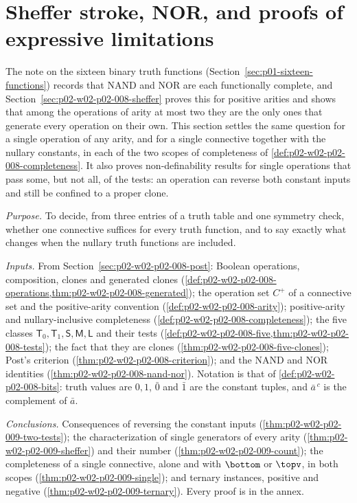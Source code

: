 \section{Sheffer stroke, NOR, and proofs of expressive limitations}
\label{sec:p02-w02-p02-009-sheffer}

The note on the sixteen binary truth functions
(Section~\ref{sec:p01-sixteen-functions}) records that NAND and NOR are each
functionally complete, and Section~\ref{sec:p02-w02-p02-008-sheffer} proves
this for positive arities and shows that among the operations of arity at
most two they are the only ones that generate every operation on their own.
This section settles the same question for a single operation of any arity,
and for a single connective together with the nullary constants, in each of
the two scopes of completeness of \cref{def:p02-w02-p02-008-completeness}.
It also proves non-definability results for single operations that pass
some, but not all, of the tests: an operation can reverse both constant
inputs and still be confined to a proper clone.

\emph{Purpose.}  To decide, from three entries of a truth table and one
symmetry check, whether one connective suffices for every truth function,
and to say exactly what changes when the nullary truth functions are
included.

\emph{Inputs.}  From Section~\ref{sec:p02-w02-p02-008-post}: Boolean
operations, composition, clones and generated clones
(\cref{def:p02-w02-p02-008-operations,thm:p02-w02-p02-008-generated}); the
operation set \(C^+\) of a connective set and the positive-arity convention
(\cref{def:p02-w02-p02-008-arity}); positive-arity and nullary-inclusive
completeness (\cref{def:p02-w02-p02-008-completeness}); the five classes
\(\mathsf T_0,\mathsf T_1,\mathsf S,\mathsf M,\mathsf L\) and their tests
(\cref{def:p02-w02-p02-008-five,thm:p02-w02-p02-008-tests}); the fact that
they are clones (\cref{thm:p02-w02-p02-008-five-clones}); Post's criterion
(\cref{thm:p02-w02-p02-008-criterion}); and the NAND and NOR identities
(\cref{thm:p02-w02-p02-008-nand-nor}).  Notation is that of
\cref{def:p02-w02-p02-008-bits}: truth values are \(0,1\), \(\bar0\) and
\(\bar1\) are the constant tuples, and \(\bar a^{\,c}\) is the complement of
\(\bar a\).

\emph{Conclusions.}  Consequences of reversing the constant inputs
(\cref{thm:p02-w02-p02-009-two-tests}); the characterization of single
generators of every arity (\cref{thm:p02-w02-p02-009-sheffer}) and their
number (\cref{thm:p02-w02-p02-009-count}); the completeness of a single
connective, alone and with \(\bottom\) or \(\topv\), in both scopes
(\cref{thm:p02-w02-p02-009-single}); and ternary instances, positive and
negative (\cref{thm:p02-w02-p02-009-ternary}).  Every proof is in the annex.

